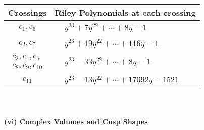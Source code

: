 \documentclass[1p]{elsarticle_modified}
\theoremstyle{definition}
\begin{document}
\begin{tabular}{m{50pt}|m{274pt}}
Crossings & \hspace{64pt}Riley Polynomials at each crossing \\
\hline $$\begin{aligned}c_{1},c_{6}\end{aligned}$$&$\begin{aligned}
&y^{23}+7 y^{22}+\cdots+8 y-1
\end{aligned}$\\
\hline $$\begin{aligned}c_{2},c_{7}\end{aligned}$$&$\begin{aligned}
&y^{23}+19 y^{22}+\cdots+116 y-1
\end{aligned}$\\
\hline $$\begin{aligned}c_{3},c_{4},c_{5}\\c_{8},c_{9},c_{10}\end{aligned}$$&$\begin{aligned}
&y^{23}-33 y^{22}+\cdots+8 y-1
\end{aligned}$\\
\hline $$\begin{aligned}c_{11}\end{aligned}$$&$\begin{aligned}
&y^{23}-13 y^{22}+\cdots+17092 y-1521
\end{aligned}$\\
\hline
\end{tabular}\\~\\
\newpage\flushleft \textbf{(vi) Complex Volumes and Cusp Shapes}
\end{document}
